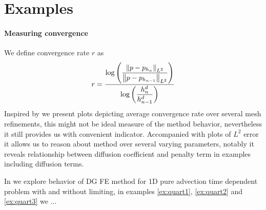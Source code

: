 \section{Examples}

\paragraph{Measuring convergence} We define convergence rate $r$ as
\begin{equation}
r = \frac{\log\left(\dfrac{\left\lVert p - p_{h_{n}}\right\rVert_{L^2}}{\left\lVert p - p_{h_{n-1}}\right\rVert_{L^2}}\right)}
{\log\left(\dfrac{h^d_{n}}{h^d_{n-1}}\right)}
\end{equation}
Inspired by \cite{Kucera} we present plots depicting average convergence rate over 
several mesh refinements, this might not be ideal measure of the method behavior, 
nevertheless it still provides us with convenient indicator. Accompanied with plots of 
$L^2$ error it allows us to reason about method over several varying parameters, notably 
it reveals relationship between diffusion coefficient and penalty term in examples 
including 
diffusion terms.

In  we explore behavior of DG FE method for 1D pure advection time 
dependent problem with and without limiting, in examples \ref{ex:quart1}, \ref{ex:quart2} 
and \ref{ex:quart3} we ...


